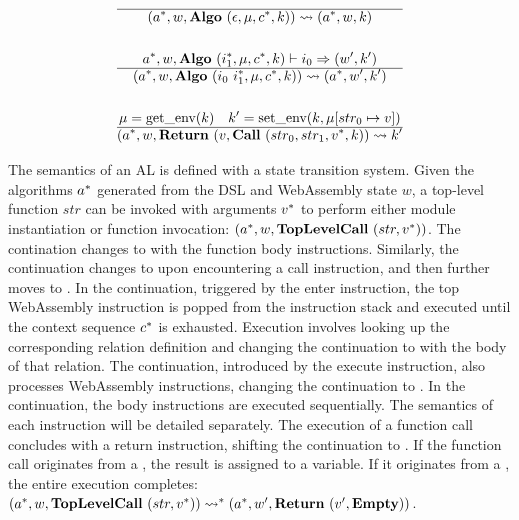 \begin{gather*}
%
\newline \\
  \hline
  (\seq{a}, w, \algo ~ (\epsilon, \mu, \seq c, k)) \leadsto (\seq{a}, w, k) \\
%
\newline \\
  \seq{a}, w, \algo ~ (\seq{i_1}, \mu, \seq c, k) \vdash i_0 \Rightarrow (w', k') \\
  \hline
  (\seq{a}, w, \algo ~ (i_0 ~ \seq{i_1}, \mu, \seq c, k)) \leadsto (\seq{a}, w', k') \\
%
\newline \\
  \mu = \getenv(k) \quad k' = \setenv(k, \mu[str_0 \mapsto v]) \\
  \hline
  (\seq{a}, w, \ret ~ (v, \call ~ (str_0, str_1, \seq v, k)) \leadsto k' \\
\end{gather*}

The semantics of an AL is defined with a state transition system.
Given the algorithms $a^*$ generated from the DSL and WebAssembly state $w$,
a top-level function $str$ can be invoked with arguments $v^*$ to perform
either module instantiation or function invocation:
$(a^*, w, \textbf{TopLevelCall} ~ (str, v^*))$.
The contination changes to \algo{} with the function body instructions.
Similarly, the continuation changes to \call{} upon encountering a call
instruction, and then further moves to \algo{}.
In the \wasm{} continuation, triggered by the enter instruction, the top
WebAssembly instruction is popped from the instruction stack and executed
until the context sequence $c^*$ is exhausted.
Execution involves looking up the corresponding relation definition and
changing the continuation to \algo{} with the body of that relation.
The \execute{} continuation, introduced by the execute instruction, also
processes WebAssembly instructions, changing the continuation to \algo{}.
In the \algo{} continuation, the body instructions are executed sequentially.
The semantics of each instruction will be detailed separately.
The execution of a function call concludes with a return instruction, shifting
the continuation to \ret{}.
If the function call originates from a \call{}, the result is assigned to a
variable.
If it originates from a \toplevelcall{}, the entire execution completes:
$
(a^*, w, \textbf{TopLevelCall} ~ (str, v^*))
\leadsto^*
(a^*, w', \textbf{Return} ~ (v', \textbf{Empty}))
$.


